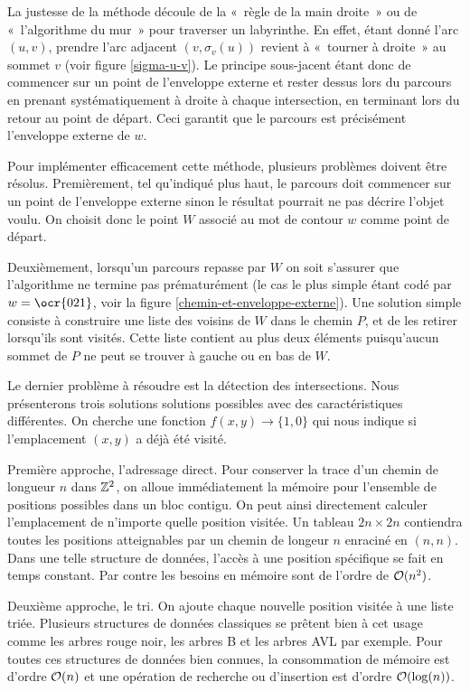 La justesse de la méthode découle de la «~règle de la main droite~» ou de «~l'algorithme du mur~» pour traverser un labyrinthe. En effet, étant donné l'arc $(u,v)$, prendre l'arc adjacent $(v,\sigma_v(u))$ revient à «~tourner à droite~» au sommet $v$ (voir figure \ref{sigma-u-v}). Le principe sous-jacent étant donc de commencer sur un point de l'enveloppe externe et rester dessus lors du parcours en prenant systématiquement à droite à chaque intersection, en terminant lors du retour au point de départ. Ceci garantit que le parcours est précisément l'enveloppe externe de $w$.

Pour implémenter efficacement cette méthode, plusieurs problèmes doivent être résolus. Premièrement, tel qu'indiqué plus haut, le parcours doit commencer sur un point de l'enveloppe externe sinon le résultat pourrait ne pas décrire l'objet voulu. On choisit donc le point $W$ associé au mot de contour $w$ comme point de départ.

Deuxièmement, lorsqu'un parcours repasse par $W$ on soit s'assurer que l'algorithme ne termine pas prématurément (le cas le plus simple étant codé par $w=\ocr{021}$, voir la figure \ref{chemin-et-enveloppe-externe}). Une solution simple consiste à construire une liste des voisins de $W$ dans le chemin $P$, et de les retirer lorsqu'ils sont visités. Cette liste contient au plus deux éléments puisqu'aucun sommet de $P$ ne peut se trouver à gauche ou en bas de $W$.

Le dernier problème à résoudre est la détection des intersections. Nous présenterons trois solutions solutions possibles avec des caractéristiques différentes. On cherche une fonction $f(x,y)\rightarrow \{1,0\}$ qui nous indique si l'emplacement $(x,y)$ a déjà été visité.

Première approche, l'adressage direct. Pour conserver la trace d'un chemin de longueur $n$ dans $\mathbb{Z}^2$, on  alloue immédiatement la mémoire pour l'ensemble de positions possibles dans un bloc contigu. On peut ainsi directement calculer l'emplacement de n'importe quelle position visitée. Un tableau $2n \times 2n$ contiendra toutes les positions atteignables par un chemin de longeur $n$ enraciné en $(n,n)$. Dans une telle structure de données, l'accès à une position spécifique se fait en temps constant. Par contre les besoins en mémoire sont  de l'ordre de $\mathcal{O}(n^2)$.

Deuxième approche, le tri. On ajoute chaque nouvelle position visitée à une liste triée. Plusieurs structures de données classiques se prêtent bien à cet usage comme les arbres rouge noir, les arbres B et les arbres AVL par exemple. Pour toutes ces structures de données bien connues, la consommation de mémoire est d'ordre $\mathcal{O}(n)$ et une opération de recherche ou d'insertion est d'ordre $\mathcal{O}(\log(n))$.

